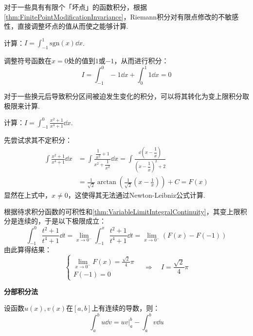 对于一些具有有限个「坏点」的函数积分，根据\cref{thm:FinitePointModificationInvariance}，Riemann积分对有限点修改的不敏感性，直接调整坏点的值从而使之能够计算.

\begin{question}
    计算：$\displaystyle I = \int_{-1}^{1}\text{sgn}(x)\dd{x}$.
\end{question}

\begin{solution}
    调整符号函数在$x=0$处的值到$1$或$-1$，从而进行积分：
    \[I = \int_{-1}^{0} -1 \dd{x} + \int_{0}^{1} 1 \dd{x} = 0\]
\end{solution}

对于一些换元后导致积分区间被迫发生变化的积分，可以将其转化为变上限积分取极限来计算.

\begin{question}
    计算：$\displaystyle I = \int_{-1}^{0}\frac{x^2+1}{x^4+1}\dd{x}$.
\end{question}

\begin{solution}
    先尝试求其不定积分：
    \begin{align*}
        \int\frac{x^2+1}{x^4+1}\dd{x} &= \int\frac{\dfrac{1}{x^2} + 1}{x^2 + \dfrac{1}{x^2}}\dd{x} = \int\frac{\dd{\left(x-\dfrac{1}{x}\right)}}{\left(x-\dfrac{1}{x}\right)^2 + 2}\\
        &= \frac{1}{\sqrt{2}}\arctan\left(\frac{1}{\sqrt{2}}\left(x-\frac{1}{x}\right)\right)+C = F(x)
    \end{align*}
    显然在上式中，$x \neq 0$，这使得其无法通过Newton-Leibniz公式计算.

    根据待求积分函数的可积性和\cref{thm:VariableLimitIntegralContinuity}，其变上限积分是连续的，于是以下极限成立：
    \[\int_{-1}^{0}\frac{t^2+1}{t^4+1}\dd{t} = \lim_{x \to 0^-}\int_{-1}^{x}\frac{t^2+1}{t^4+1}\dd{t} = \lim_{x \to 0^-}(F(x)-F(-1))\]
    由此算得结果：
    \[\begin{cases}
        \lim\limits_{x \to 0^-}F(x) = \frac{\sqrt{2}}{4}\pi \\
        F(-1) = 0
    \end{cases} \quad\Rightarrow\quad I = \frac{\sqrt{2}}{4}\pi\]
\end{solution}

\begin{theorem}
    \textbf{分部积分法}

    设函数$u(x),v(x)$在$[a,b]$上有连续的导数，则：
    \[\int_{a}^{b}u\dd{v} = uv\Big|_a^b - \int_{a}^{b}v\dd{u}\]
\end{theorem}

